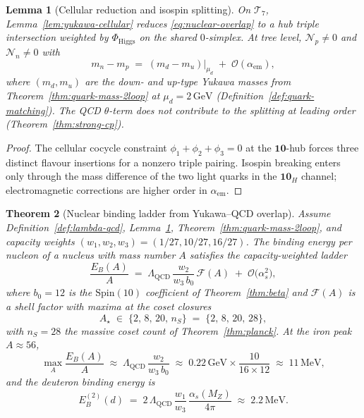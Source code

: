 \documentclass[aps,prd,onecolumn,amsmath,amssymb,nofootinbib,11pt]{revtex4-2}
\numberwithin{equation}{section}
\theoremstyle{plain}
\newtheorem{theorem}{Theorem}[section]
\newtheorem{lemma}[theorem]{Lemma}
\theoremstyle{definition}
\theoremstyle{remark}
\newcommand{\Spin}{\mathrm{Spin}}
\begin{document}
\begin{lemma}[Cellular reduction and isospin splitting]\label{lem:nuclear-cellular}
On $\mathcal{T}_7$, Lemma~\ref{lem:yukawa-cellular} reduces
\eqref{eq:nuclear-overlap} to a hub triple intersection weighted by
$\Phi_{\mathrm{Higgs}}$ on the shared $0$-simplex. At tree level,
$\mathcal{N}_p\neq 0$ and $\mathcal{N}_n\neq 0$ with
\begin{equation}\label{eq:isospin-split}
  m_n-m_p
  \;=\;
  (m_d-m_u)\Big|_{\mu_d}
  \;+\;
  \mathcal{O}(\alpha_{\mathrm{em}}),
\end{equation}
where $(m_d,m_u)$ are the down- and up-type Yukawa masses from
Theorem~\ref{thm:quark-mass-2loop} at $\mu_d=2\,\mathrm{GeV}$
(Definition~\ref{def:quark-matching}). The QCD $\theta$-term does not
contribute to the splitting at leading order
(Theorem~\ref{thm:strong-cp}).
\end{lemma}

\begin{proof}
The cellular cocycle constraint $\phi_1+\phi_2+\phi_3=0$ at the
$\mathbf{10}$-hub forces three distinct flavour insertions for a nonzero
triple pairing. Isospin breaking enters only through the mass difference of
the two light quarks in the $\mathbf{10}_H$ channel; electromagnetic
corrections are higher order in $\alpha_{\mathrm{em}}$.
\end{proof}

\begin{theorem}[Nuclear binding ladder from Yukawa--QCD overlap]
\label{thm:nuclear-binding}
Assume Definition~\ref{def:lambda-qcd}, Lemma~\ref{lem:nuclear-cellular},
Theorem~\ref{thm:quark-mass-2loop}, and capacity weights
$(w_1,w_2,w_3)=(1/27,10/27,16/27)$. The \emph{binding energy per nucleon}
of a nucleus with mass number $A$ satisfies the capacity-weighted ladder
\begin{equation}\label{eq:binding-ladder}
  \frac{E_B(A)}{A}
  \;=\;
  \Lambda_{\mathrm{QCD}}\,
  \frac{w_2}{w_3\,b_0}\,
  \mathcal{F}(A)
  \;+\;
  \mathcal{O}\!\bigl(\alpha_s^2\bigr),
\end{equation}
where $b_0=12$ is the $\Spin(10)$ coefficient of Theorem~\ref{thm:beta} and
$\mathcal{F}(A)$ is a shell factor with maxima at the \emph{coset closures}
\begin{equation}\label{eq:magic-numbers}
  A_\star \;\in\;\{2,\,8,\,20,\,n_S\}
  \;=\;
  \{2,\,8,\,20,\,28\},
\end{equation}
with $n_S=28$ the massive coset count of Theorem~\ref{thm:planck}. At the
iron peak $A\approx 56$,
\begin{equation}\label{eq:binding-peak}
  \max_A\frac{E_B(A)}{A}
  \;\approx\;
  \Lambda_{\mathrm{QCD}}\,\frac{w_2}{w_3\,b_0}
  \;\approx\;
  0.22\,\mathrm{GeV}\times\frac{10}{16\times 12}
  \;\approx\;
  11\,\mathrm{MeV},
\end{equation}
and the deuteron binding energy is
\begin{equation}\label{eq:deuteron-binding}
  E_B^{(2)}(d)
  \;=\;
  2\,\Lambda_{\mathrm{QCD}}\,
  \frac{w_1}{w_3}\,
  \frac{\alpha_s(M_Z)}{4\pi}
  \;\approx\;
  2.2\,\mathrm{MeV}.
\end{equation}
\end{theorem}
\end{document}

